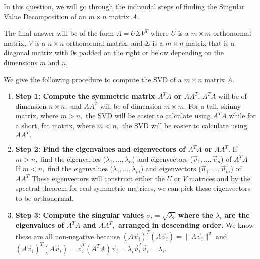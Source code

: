 

In this question, we will go through the indivudal steps of finding the Singular Value Decomposition of an $m \times n$ matrix $A.$

The final answer will be of the form $A = U \Sigma V^{T}$ where $U$ is a $m \times m$ orthonormal matrix, $V$ is a $n \times n$ orthonormal matrix, and $\Sigma$ is a $m \times n$ matrix that is a diagonal matrix with $0$s padded on the right or below depending on the dimensions $m$ and $n.$

We give the following procedure to compute the SVD of a $m \times n$ matrix $A.$

\begin{enumerate}[label=(\roman*)]
  \item \textbf{Step 1: Compute the symmetric matrix $A^{T} A$ or $A A^{T}.$} \vskip 1pt
  $A^{T}A$ will be of dimension $n \times n,$ and $AA^{T}$ will be of dimension $m \times m.$ \vskip 1pt
  For a tall, skinny matrix, where $m > n,$ the SVD will be easier to calculate using $A^{T}A$ while for a short, fat matrix, where $m < n,$ the SVD will be easier to calculate using $AA^{T}.$

  \item \textbf{Step 2: Find the eigenvalues and eigenvectors of $A^{T} A$ or $AA^{T}.$} \vskip 1pt
  If $m > n,$ find the eigenvalues ($\lambda_1, \ldots, \lambda_{n}$) and eigenvectors ($\vec{v}_1, \ldots, \vec{v}_{n}$) of $A^TA$ \\
  If $m < n,$ find the eigenvalues ($\lambda_1, \ldots, \lambda_{m}$) and eigenvectors ($\vec{u}_{1}, \ldots, \vec{u}_{m}$) of $AA^{T}$ \vskip 1pt
  These eigenvectors will construct either the $U$ or $V$ matrices and by the spectral theorem for real symmetric matrices, we can pick these eigenvectors to be orthonormal.

  \item \textbf{Step 3: Compute the singular values $\sigma_i = \sqrt{\lambda_i}$ where the $\lambda_i$ are the eigenvalues of $A^{T}A$ and $AA^{T},$ arranged in descending order.} \vskip 1pt
  We know these are all non-negative because $(A\vec{v}_i)^T(A\vec{v}_i) = \|A \vec{v}_i\|^2$ and $(A\vec{v}_i)^T(A\vec{v}_i) =\vec{v}_i^T(A^T A)\vec{v}_i = \lambda_i \vec{v}_i^T\vec{v}_i = \lambda_i$.


\end{enumerate}
